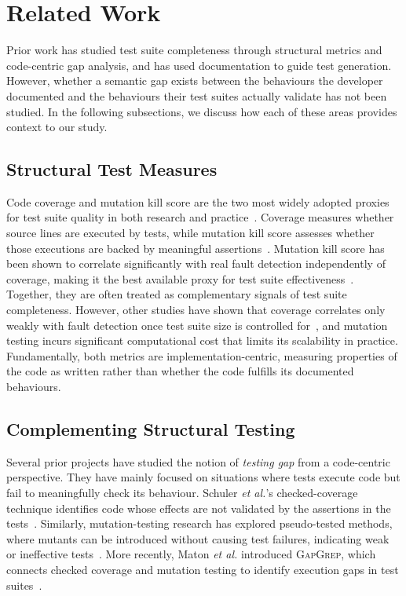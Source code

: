 \section{Related Work}
\label{sec:rw}
\label{sec:related}

Prior work has studied test suite completeness through structural metrics and code-centric gap analysis, and has used documentation to guide test generation. However, whether a semantic gap exists between the behaviours the developer documented and the behaviours their test suites actually validate has not been studied. In the following subsections, we discuss how each of these areas provides context to our study.

\subsection{Structural Test Measures}

Code coverage and mutation kill score are the two most widely adopted proxies for test suite quality in both research and practice~\cite{papadakis2019mutation, 10.1145/2568225.2568278, 10.1145/2635868.2635929}. Coverage measures whether source lines are executed by tests, while mutation kill score assesses whether those executions are backed by meaningful assertions~\cite{10.1145/1062455.1062530}. Mutation kill score has been shown to correlate significantly with real fault detection independently of coverage, making it the best available proxy for test suite effectiveness~\cite{10.1145/2635868.2635929}.
Together, they are often treated as complementary signals of test suite completeness. However, other studies have shown that coverage correlates only weakly with fault detection once test suite size is controlled for~\cite{10.1145/2568225.2568271}, and mutation testing incurs significant computational cost that limits its scalability in practice. 
Fundamentally, both metrics are implementation-centric, measuring properties of the code as written rather than whether the code fulfills its documented behaviours. 

\subsection{Complementing Structural Testing} 

Several prior projects have studied the notion of \emph{testing gap} from a code-centric perspective. They have mainly focused on situations where tests execute code but fail to meaningfully check its behaviour. Schuler \textit{et al.}'s checked-coverage technique identifies code whose effects are not validated by the assertions in the tests~\cite{schuler2013checked}. Similarly, mutation-testing research has explored pseudo-tested methods, where mutants can be introduced without causing test failures, indicating weak or ineffective tests~\cite{vera2019comprehensive}. More recently, Maton \textit{et al.} introduced \textsc{GapGrep}, which connects checked coverage and mutation testing to identify execution gaps in test suites~\cite{maton2025tests}. 

